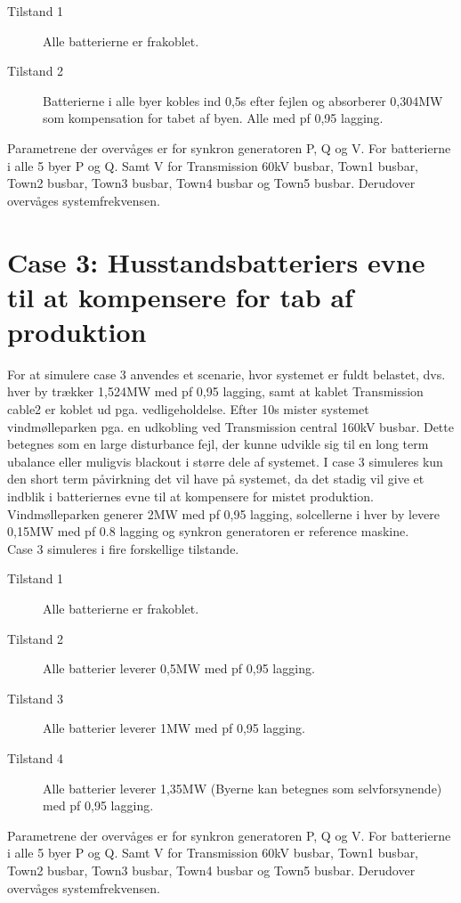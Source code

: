 \begin{description}
	\item[Tilstand 1] Alle batterierne er frakoblet.
	\item[Tilstand 2] Batterierne i alle byer kobles ind 0,5s efter fejlen og absorberer 0,304MW som kompensation for tabet af byen. Alle med pf 0,95 lagging.
\end{description}

Parametrene der overvåges er for synkron generatoren P, Q og V.
For batterierne i alle 5 byer P og Q. Samt V for Transmission 60kV busbar, Town1 busbar, Town2 busbar, Town3 busbar, Town4 busbar og Town5 busbar.
Derudover overvåges systemfrekvensen.

\section{Case 3: Husstandsbatteriers evne til at kompensere for tab af produktion}
\label{SimCase3}
For at simulere case 3 anvendes et scenarie, hvor systemet er fuldt belastet, dvs. hver by trækker 1,524MW med pf 0,95 lagging, samt at kablet Transmission cable2 er koblet ud pga. vedligeholdelse. Efter 10s mister systemet vindmølleparken pga. en udkobling ved Transmission central 160kV busbar. Dette betegnes som en large disturbance fejl, der kunne udvikle sig til en long term ubalance eller muligvis blackout i større dele af systemet. I case 3 simuleres kun den short term påvirkning det vil have på systemet, da det stadig vil give et indblik i batteriernes evne til at kompensere for mistet produktion.\\
Vindmølleparken generer 2MW med pf 0,95 lagging, solcellerne i hver by levere 0,15MW med pf 0.8 lagging og synkron generatoren er reference maskine.\\
Case 3 simuleres i fire forskellige tilstande.

\begin{description}
	\item[Tilstand 1] Alle batterierne er frakoblet.
	\item[Tilstand 2] Alle batterier leverer 0,5MW med pf 0,95 lagging.
	\item[Tilstand 3] Alle batterier leverer 1MW med pf 0,95 lagging.
	\item[Tilstand 4] Alle batterier leverer 1,35MW (Byerne kan betegnes som selvforsynende) med pf 0,95 lagging.
\end{description}

Parametrene der overvåges er for synkron generatoren P, Q og V.
For batterierne i alle 5 byer P og Q. Samt V for Transmission 60kV busbar, Town1 busbar, Town2 busbar, Town3 busbar, Town4 busbar og Town5 busbar.
Derudover overvåges systemfrekvensen.

